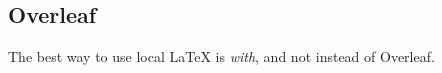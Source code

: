 \subsection{Overleaf}
The best way to use local \LaTeX{} is \emph{with}, and not instead of Overleaf. 
